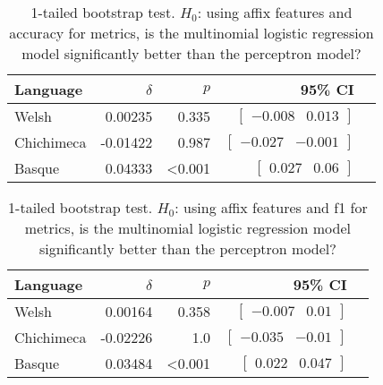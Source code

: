 \documentclass{article}
\begin{document}
\begin{table}[ht]
\centering
\begin{tabular}{lrrrc}
\textbf{Language} & $\delta$ & $p$ & \textbf{95\% CI}\\
\hline
Welsh & 0.00235 & 0.335 & $\begin{bmatrix}-0.008 & 0.013\end{bmatrix}$ \\
Chichimeca & -0.01422 & 0.987 & $\begin{bmatrix}-0.027 & -0.001\end{bmatrix}$ \\
Basque & 0.04333 & <0.001 & $\begin{bmatrix}0.027 & 0.06\end{bmatrix}$ \\
\end{tabular}
\caption{1-tailed bootstrap test. $H_0$: using affix features and accuracy for metrics, is the multinomial logistic regression model significantly better than the perceptron model?}
\label{tab:affix-accuracy-mc}
\end{table}

\begin{table}[ht]
\centering
\begin{tabular}{lrrrc}
\textbf{Language} & $\delta$ & $p$ & \textbf{95\% CI}\\
\hline
Welsh & 0.00164 & 0.358 & $\begin{bmatrix}-0.007 & 0.01\end{bmatrix}$ \\
Chichimeca & -0.02226 & 1.0 & $\begin{bmatrix}-0.035 & -0.01\end{bmatrix}$ \\
Basque & 0.03484 & <0.001 & $\begin{bmatrix}0.022 & 0.047\end{bmatrix}$ \\
\end{tabular}
\caption{1-tailed bootstrap test. $H_0$: using affix features and f1 for metrics, is the multinomial logistic regression model significantly better than the perceptron model?}
\label{tab:affix-f1-mc}
\end{table}
\end{document}
